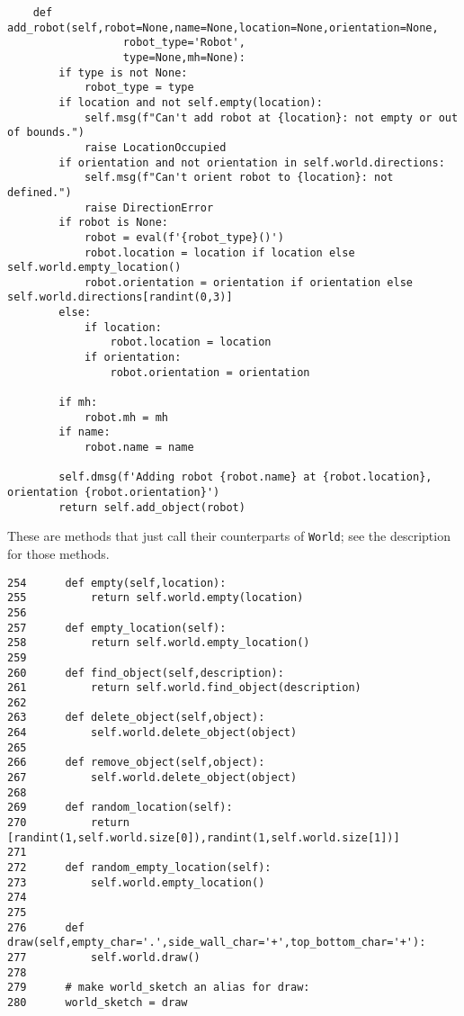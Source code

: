 \documentclass[11pt]{tufte-handout}
\begin{document}
\begin{verbatim}
    def add_robot(self,robot=None,name=None,location=None,orientation=None,
                  robot_type='Robot',
                  type=None,mh=None):
        if type is not None:
            robot_type = type
        if location and not self.empty(location):
            self.msg(f"Can't add robot at {location}: not empty or out of bounds.")
            raise LocationOccupied       
        if orientation and not orientation in self.world.directions:
            self.msg(f"Can't orient robot to {location}: not defined.")            
            raise DirectionError
        if robot is None:
            robot = eval(f'{robot_type}()')
            robot.location = location if location else self.world.empty_location()
            robot.orientation = orientation if orientation else self.world.directions[randint(0,3)]
        else:
            if location:
                robot.location = location
            if orientation:
                robot.orientation = orientation

        if mh:
            robot.mh = mh
        if name:
            robot.name = name
            
        self.dmsg(f'Adding robot {robot.name} at {robot.location}, orientation {robot.orientation}')
        return self.add_object(robot)
\end{verbatim}

These are methods that just call their counterparts of \texttt{World}; see the description for those methods.

\begin{verbatim}
254      def empty(self,location):
255          return self.world.empty(location)
256  
257      def empty_location(self):
258          return self.world.empty_location()
259  
260      def find_object(self,description):
261          return self.world.find_object(description)
262  
263      def delete_object(self,object):
264          self.world.delete_object(object)
265  
266      def remove_object(self,object):
267          self.world.delete_object(object)
268  
269      def random_location(self):
270          return [randint(1,self.world.size[0]),randint(1,self.world.size[1])]
271  
272      def random_empty_location(self):
273          self.world.empty_location()
274  
275  
276      def draw(self,empty_char='.',side_wall_char='+',top_bottom_char='+'):
277          self.world.draw()
278  
279      # make world_sketch an alias for draw:
280      world_sketch = draw
\end{verbatim}
\end{document}
